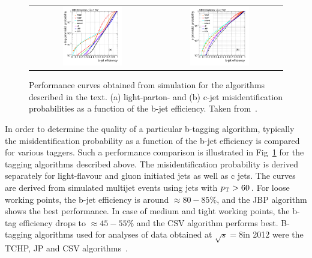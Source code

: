 \begin{figure}[!tp]
  \centering 
  \begin{tabular}{cc}
    \includegraphics[width=0.49\textwidth]{figures/figAlgo_Combined_udsgvsb_Efficienies.png} &
    \includegraphics[width=0.49\textwidth]{figures/figAlgo_Combined_cvsb_Efficienies.png} 
  \end{tabular}
  \caption{Performance curves obtained from simulation for the algorithms described in the text. (a) light-parton- and (b) c-jet misidentification probabilities as a function of the b-jet efficiency. Taken from~\cite{Chatrchyan:2012jua}.}
  \label{fig:btagging}
\end{figure}  
In order to determine the quality of a particular b-tagging algorithm, typically the misidentification probability as a function of the b-jet efficiency is compared for various taggers. Such a performance comparison is illustrated in Fig~\ref{fig:btagging} for the tagging algorithms described above. The misidentification probability is derived separately for light-flavour and gluon initiated jets as well as c jets. The curves are derived from simulated multijet events using jets with $p_{\text{T}} > 60$\,\gev. For loose working points, the b-jet efficiency is around $\approx 80-85\%$, and the JBP algorithm shows the best performance. In case of medium and tight working points, the b-tag efficiency drops to $\approx 45-55\%$ and the CSV algorithm performs best. B-tagging algorithms used for analyses of data obtained at $\sqrt{s} = 8$\tev in 2012 were the TCHP, JP and CSV algorithms~\cite{CMS-PAS-BTV-13-001}. 
